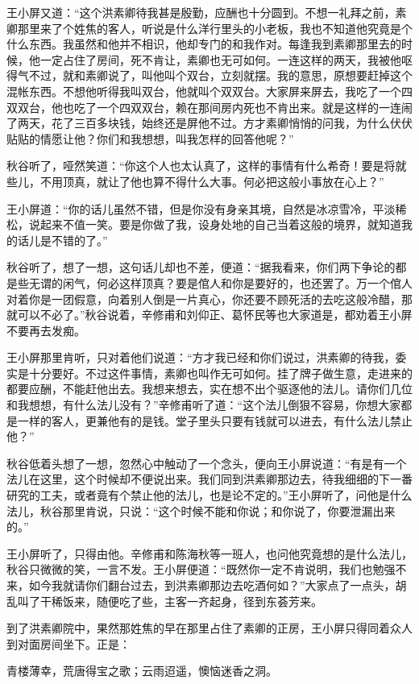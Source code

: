 \documentclass[12pt,UTF8]{ctexbook}
\begin{document}
{{{王小屏又道：“这个洪素卿待我甚是殷勤，应酬也十分圆到。不想一礼拜之前，素卿那里来了个姓焦的客人，听说是什么洋行里头的小老板，我也不知道他究竟是个什么东西。我虽然和他并不相识，他却专门的和我作对。每逢我到素卿那里去的时候，他一定占住了房间，死不肯让，素卿也无可如何。一连这样的两天，我被他呕得气不过，就和素卿说了，叫他叫个双台，立刻就摆。我的意思，原想要赶掉这个混帐东西。不想他听得我叫双台，他就叫个双双台。大家屏来屏去，我吃了一个四双双台，他也吃了一个四双双台，赖在那间房内死也不肯出来。就是这样的一连闹了两天，花了三百多块钱，始终还是屏他不过。方才素卿悄悄的问我，为什么伏伏贴贴的情愿让他？你们和我想想，叫我怎样的回答他呢？”

秋谷听了，哑然笑道：“你这个人也太认真了，这样的事情有什么希奇！要是将就些儿，不用顶真，就让了他也算不得什么大事。何必把这般小事放在心上？”

王小屏道：“你的话儿虽然不错，但是你没有身亲其境，自然是冰凉雪冷，平淡稀松，说起来不值一笑。要是你做了我，设身处地的自己当着这般的境界，就知道我的话儿是不错的了。”

秋谷听了，想了一想，这句话儿却也不差，便道：“据我看来，你们两下争论的都是些无谓的闲气，何必这样顶真？要是倌人和你是要好的，也还罢了。万一个倌人对着你是一团假意，向着别人倒是一片真心，你还要不顾死活的去吃这般冷醋，那就可以不必了。”秋谷说着，辛修甫和刘仰正、葛怀民等也大家道是，都劝着王小屏不要再去发痴。

王小屏那里肯听，只对着他们说道：“方才我已经和你们说过，洪素卿的待我，委实是十分要好。不过这件事情，素卿也叫作无可如何。挂了牌子做生意，走进来的都要应酬，不能赶他出去。我想来想去，实在想不出个驱逐他的法儿。请你们几位和我想想，有什么法儿没有？”辛修甫听了道：“这个法儿倒狠不容易，你想大家都是一样的客人，更兼他有的是钱。堂子里头只要有钱就可以进去，有什么法儿禁止他？”

秋谷低着头想了一想，忽然心中触动了一个念头，便向王小屏说道：“有是有一个法儿在这里，这个时候却不便说出来。我们同到洪素卿那边去，待我细细的下一番研究的工夫，或者竟有个禁止他的法儿，也是论不定的。”王小屏听了，问他是什么法儿，秋谷那里肯说，只说：“这个时候不能和你说；和你说了，你要泄漏出来的。”

王小屏听了，只得由他。辛修甫和陈海秋等一班人，也问他究竟想的是什么法儿，秋谷只微微的笑，一言不发。王小屏便道：“既然你一定不肯说明，我们也勉强不来，如今我就请你们翻台过去，到洪素卿那边去吃酒何如？”大家点了一点头，胡乱叫了干稀饭来，随便吃了些，主客一齐起身，径到东荟芳来。

到了洪素卿院中，果然那姓焦的早在那里占住了素卿的正房，王小屏只得同着众人到对面房间坐下。正是：

青楼薄幸，荒唐得宝之歌；云雨迢遥，懊恼迷香之洞。

}}}
\end{document}
